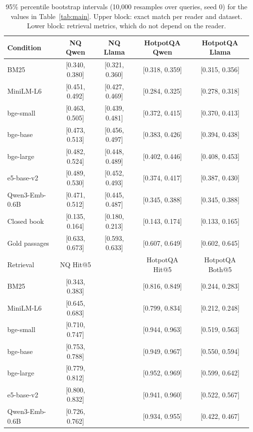 \begin{table}[t]
\centering
\small
\caption{95\% percentile bootstrap intervals (10,000 resamples over queries, seed 0) for the values in Table~\ref{tab:main}. Upper block: exact match per reader and dataset. Lower block: retrieval metrics, which do not depend on the reader.}
\label{tab:ci}
\begin{tabular}{lcccc}
\toprule
Condition & NQ Qwen & NQ Llama & HotpotQA Qwen & HotpotQA Llama \\
\midrule
BM25 & [0.340, 0.380] & [0.321, 0.360] & [0.318, 0.359] & [0.315, 0.356] \\
MiniLM-L6 & [0.451, 0.492] & [0.427, 0.469] & [0.284, 0.325] & [0.278, 0.318] \\
bge-small & [0.463, 0.505] & [0.439, 0.481] & [0.372, 0.415] & [0.370, 0.413] \\
bge-base & [0.473, 0.513] & [0.456, 0.497] & [0.383, 0.426] & [0.394, 0.438] \\
bge-large & [0.482, 0.524] & [0.448, 0.489] & [0.402, 0.446] & [0.408, 0.453] \\
e5-base-v2 & [0.489, 0.530] & [0.452, 0.493] & [0.374, 0.417] & [0.387, 0.430] \\
Qwen3-Emb-0.6B & [0.471, 0.512] & [0.445, 0.487] & [0.345, 0.388] & [0.345, 0.388] \\
Closed book & [0.135, 0.164] & [0.180, 0.213] & [0.143, 0.174] & [0.133, 0.165] \\
Gold passages & [0.633, 0.673] & [0.593, 0.633] & [0.607, 0.649] & [0.602, 0.645] \\
\midrule
Retrieval & NQ Hit@5 & & HotpotQA Hit@5 & HotpotQA Both@5 \\
\midrule
BM25 & [0.343, 0.383] & & [0.816, 0.849] & [0.244, 0.283] \\
MiniLM-L6 & [0.645, 0.683] & & [0.799, 0.834] & [0.212, 0.248] \\
bge-small & [0.710, 0.747] & & [0.944, 0.963] & [0.519, 0.563] \\
bge-base & [0.753, 0.788] & & [0.949, 0.967] & [0.550, 0.594] \\
bge-large & [0.779, 0.812] & & [0.952, 0.969] & [0.599, 0.642] \\
e5-base-v2 & [0.800, 0.832] & & [0.941, 0.960] & [0.522, 0.567] \\
Qwen3-Emb-0.6B & [0.726, 0.762] & & [0.934, 0.955] & [0.422, 0.467] \\
\bottomrule
\end{tabular}
\end{table}
